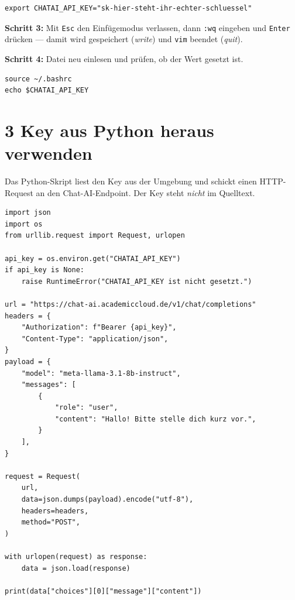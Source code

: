 \documentclass[ngerman,11pt]{article}
\begin{document}
\begin{lstlisting}[style=bashfile]
export CHATAI_API_KEY="sk-hier-steht-ihr-echter-schluessel"
\end{lstlisting}

\noindent \textbf{Schritt 3:} Mit \texttt{Esc} den Einfügemodus verlassen, dann \texttt{:wq} eingeben und \texttt{Enter} drücken --- damit wird gespeichert (\emph{write}) und \texttt{vim} beendet (\emph{quit}).

\smallskip
\noindent \textbf{Schritt 4:} Datei neu einlesen und prüfen, ob der Wert gesetzt ist.

\begin{lstlisting}[style=bash]
source ~/.bashrc
echo $CHATAI_API_KEY
\end{lstlisting}

\section*{3 Key aus Python heraus verwenden}

Das Python-Skript liest den Key aus der Umgebung und schickt einen HTTP-Request an den Chat-AI-Endpoint. Der Key steht \emph{nicht} im Quelltext.

\begin{lstlisting}[style=python]
import json
import os
from urllib.request import Request, urlopen

api_key = os.environ.get("CHATAI_API_KEY")
if api_key is None:
    raise RuntimeError("CHATAI_API_KEY ist nicht gesetzt.")

url = "https://chat-ai.academiccloud.de/v1/chat/completions"
headers = {
    "Authorization": f"Bearer {api_key}",
    "Content-Type": "application/json",
}
payload = {
    "model": "meta-llama-3.1-8b-instruct",
    "messages": [
        {
            "role": "user",
            "content": "Hallo! Bitte stelle dich kurz vor.",
        }
    ],
}

request = Request(
    url,
    data=json.dumps(payload).encode("utf-8"),
    headers=headers,
    method="POST",
)

with urlopen(request) as response:
    data = json.load(response)

print(data["choices"][0]["message"]["content"])
\end{lstlisting}
\end{document}
